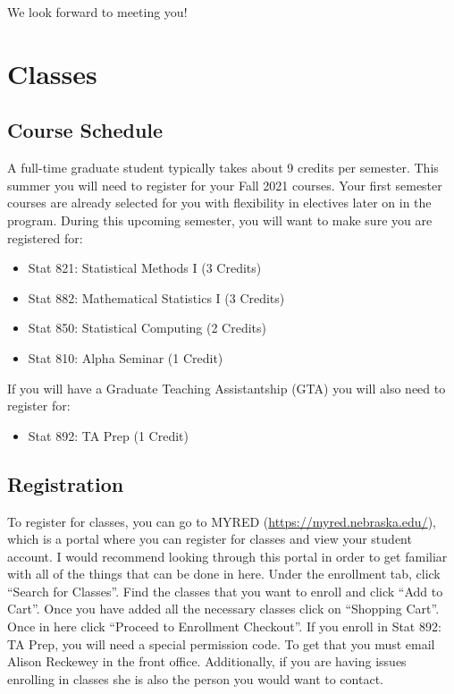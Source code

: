 \documentclass[
  12pt,
]{book}
\providecommand{\tightlist}{%
  \setlength{\itemsep}{0pt}\setlength{\parskip}{0pt}}
\begin{document}
We look forward to meeting you!

\hypertarget{classes}{%
\chapter{Classes}\label{classes}}

\hypertarget{course-schedule}{%
\section{Course Schedule}\label{course-schedule}}

A full-time graduate student typically takes about 9 credits per semester. This summer you will need to register for your Fall 2021 courses. Your first semester courses are already selected for you with flexibility in electives later on in the program. During this upcoming semester, you will want to make sure you are registered for:

\begin{itemize}
\tightlist
\item
  Stat 821: Statistical Methods I (3 Credits)
\item
  Stat 882: Mathematical Statistics I (3 Credits)
\item
  Stat 850: Statistical Computing (2 Credits)
\item
  Stat 810: Alpha Seminar (1 Credit)
\end{itemize}

If you will have a Graduate Teaching Assistantship (GTA) you will also need to register for:

\begin{itemize}
\tightlist
\item
  Stat 892: TA Prep (1 Credit)
\end{itemize}

\hypertarget{registration}{%
\section{Registration}\label{registration}}

To register for classes, you can go to MYRED (\url{https://myred.nebraska.edu/}), which is a portal where you can register for classes and view your student account. I would recommend looking through this portal in order to get familiar with all of the things that can be done in here. Under the enrollment tab, click ``Search for Classes''. Find the classes that you want to enroll and click ``Add to Cart''. Once you have added all the necessary classes click on ``Shopping Cart''. Once in here click ``Proceed to Enrollment Checkout''. If you enroll in Stat 892: TA Prep, you will need a special permission code. To get that you must email Alison Reckewey in the front office. Additionally, if you are having issues enrolling in classes she is also the person you would want to contact.
\end{document}
